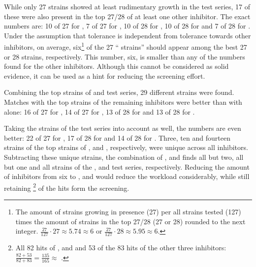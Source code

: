 While only 27 strains showed at least rudimentary growth in the \van{} test series, 17 of these were also present in the top 27/28 of at least one other inhibitor. The exact numbers are: 10 of 27 for \fur{}, 7 of 27 for \hmf{}, 10 of 28 for \fora{}, 10 of 28 for \acet{} and 7 of 28 for \laev{}. Under the assumption that \van{} tolerance is independent from tolerance towards other inhibitors, on average, six\footnote{The amount of strains growing in \van{} presence (27) per all strains tested (127) times the amount of strains in the top 27/28 (27 or 28) rounded to the next integer.
$\frac{27}{127} \cdot 27 \approx 5.74 \approx 6$ or 
$\frac{27}{127} \cdot 28 \approx 5.95 \approx 6$.}
 of the 27 \enquote{\van{} strains} should appear among the best 27 or 28 strains, respectively. This number, six, is smaller than any of the numbers found for the other inhibitors. Although this cannot be considered as solid evidence, it can be used as a hint for reducing the screening effort.

Combining the top strains of \acet{} and \van{} test series, 29 different strains were found. Matches with the top strains of the remaining inhibitors were better than with \van{} alone: 16 of 27 for \fur{}, 14 of 27 for \hmf{}, 13 of 28 for \fora{} and 13 of 28 for \laev{}.


Taking the strains of the \hmf{} test series into account as well, the numbers are even better: 22 of 27 for \fur{}, 17 of 28 for \fora{} and 14 of 28 for \laev{}. Three, ten and fourteen strains of the top strains of \fur{}, \fora{} and \laev{}, respectively, were unique across all inhibitors. Subtracting these unique strains, the combination of \acet{}, \van{} and \hmf{} finds all but two, all but one and all strains of the \fur{}, \fora{} and \laev{} test series, respectively. Reducing the amount of inhibitors from six to \acet{}, \van{} and \hmf{} would reduce the workload considerably, while still retaining \footnote{All 82 hits of \acet{}, \van{} and \hmf{} and 53 of the 83 hits of the other three inhibitors: $\frac{82 + 53}{82 + 83} = \frac{135}{165} \approx$ .} of the hits form the screening.

